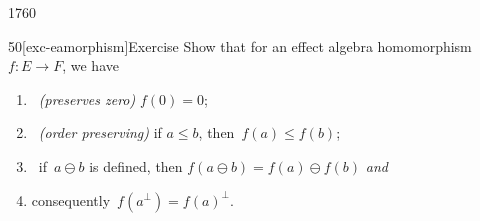 \begin{parsec}{1760}
\begin{point}{50}[exc-eamorphism]{Exercise}%
Show that for an effect algebra homomorphism~$f\colon E \to F$,
    we have
    \begin{enumerate}
        \item~\emph{(preserves zero)} $f(0) = 0$;
        \item~\emph{(order preserving)} if $a \leq b$, then~$f(a) \leq f(b)$;
        \item~if~$a\ominus b$ is defined,
            then $f(a \ominus b) = f(a) \ominus f(b)$ \emph{and}
        \item consequently~$f(a^\perp) = f(a)^\perp$.
    \end{enumerate}
\end{point}
\end{parsec}


